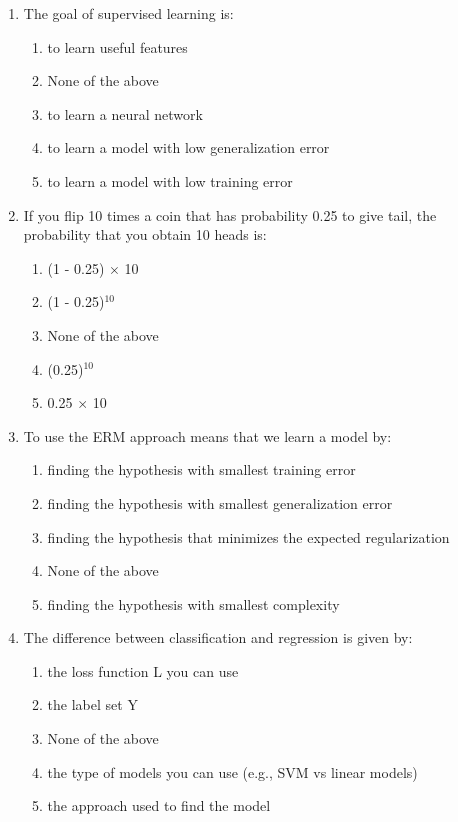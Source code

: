 \documentclass[a4paper,11pt,oneside]{book}
\begin{document}
\begin{enumerate}

    \item The goal of supervised learning is:
    \begin{enumerate}[label=\alph*)]
        \item to learn useful features
        \item None of the above
        \item to learn a neural network
        \item to learn a model with low generalization error
        \item to learn a model with low training error
    \end{enumerate}

    \item If you flip 10 times a coin that has probability 0.25 to give tail, the probability that you obtain 10 heads is:
    \begin{enumerate}[label=\alph*)]
        \item (1 - 0.25) $\times$ 10
        \item (1 - 0.25)$^{10}$
        \item None of the above
        \item (0.25)$^{10}$
        \item 0.25 $\times$ 10
    \end{enumerate}

    \item To use the ERM approach means that we learn a model by:
    \begin{enumerate}[label=\alph*)]
        \item finding the hypothesis with smallest training error
        \item finding the hypothesis with smallest generalization error
        \item finding the hypothesis that minimizes the expected regularization
        \item None of the above
        \item finding the hypothesis with smallest complexity
    \end{enumerate}

    \item The difference between classification and regression is given by:
    \begin{enumerate}[label=\alph*)]
        \item the loss function L you can use
        \item the label set Y
        \item None of the above
        \item the type of models you can use (e.g., SVM vs linear models)
        \item the approach used to find the model
    \end{enumerate}


\end{enumerate}
\end{document}
